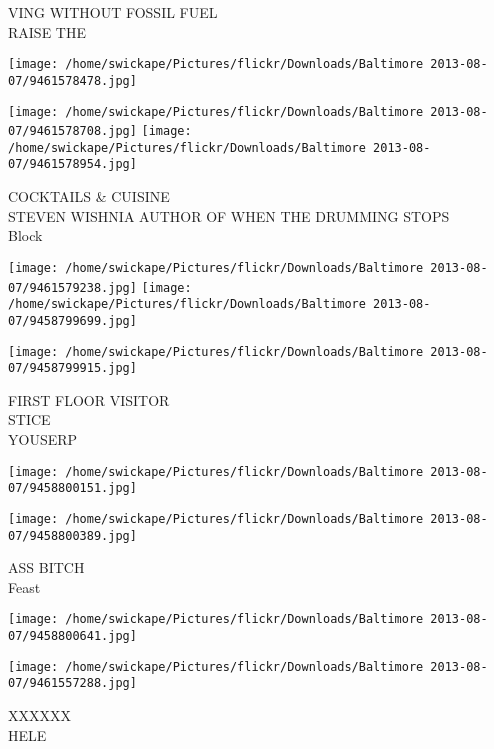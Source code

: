 \documentclass[10pt,letterpaper]{article}
\begin{document}
VING WITHOUT FOSSIL FUEL\\
RAISE THE\\
\pagebreak

\texttt{[image: /home/swickape/Pictures/flickr/Downloads/Baltimore 2013-08-07/9461578478.jpg]}

\vspace{0.25in}
\texttt{[image: /home/swickape/Pictures/flickr/Downloads/Baltimore 2013-08-07/9461578708.jpg]}
\texttt{[image: /home/swickape/Pictures/flickr/Downloads/Baltimore 2013-08-07/9461578954.jpg]}

COCKTAILS \& CUISINE\\
STEVEN WISHNIA AUTHOR OF WHEN THE DRUMMING STOPS\\
Block\\
\pagebreak

\texttt{[image: /home/swickape/Pictures/flickr/Downloads/Baltimore 2013-08-07/9461579238.jpg]}
\texttt{[image: /home/swickape/Pictures/flickr/Downloads/Baltimore 2013-08-07/9458799699.jpg]}

\vspace{0.25in}
\texttt{[image: /home/swickape/Pictures/flickr/Downloads/Baltimore 2013-08-07/9458799915.jpg]}

FIRST FLOOR VISITOR\\
STICE\\
YOUSERP\\
\pagebreak

\texttt{[image: /home/swickape/Pictures/flickr/Downloads/Baltimore 2013-08-07/9458800151.jpg]}

\vspace{0.25in}
\texttt{[image: /home/swickape/Pictures/flickr/Downloads/Baltimore 2013-08-07/9458800389.jpg]}

ASS BITCH\\
Feast\\
\pagebreak

\texttt{[image: /home/swickape/Pictures/flickr/Downloads/Baltimore 2013-08-07/9458800641.jpg]}

\vspace{0.25in}
\texttt{[image: /home/swickape/Pictures/flickr/Downloads/Baltimore 2013-08-07/9461557288.jpg]}

XXXXXX\\
HELE\\
\pagebreak
\end{document}
